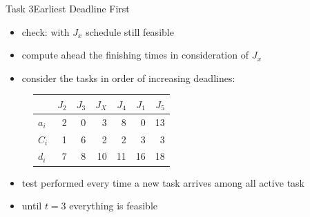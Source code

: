 \begin{frame}[allowframebreaks]{Task 3}{Earliest Deadline First\vspace{0.5cm}}
  \begin{itemize}
    \item \alert{check:} with $J_x$ schedule \alert{still feasible}
    \item compute \alert{ahead} the \alert{finishing times} in consideration of $J_x$
    \item consider the tasks \alert{in order of increasing deadlines:}
  \end{itemize}
  \begin{figure}
  \centering
  \begin{tabular}{|l|r|r|r|r|r|r|}
    \hline             & $J_2$ & $J_3$ & $J_X$ & $J_4$ & $J_1$ & $J_5$ \\
    \hline \hline$a_i$ & 2     & 0     & 3     & 8     & 0     & 13 \\
    \hline$C_i$        & 1     & 6     & 2     & 2     & 3     & 3 \\
    \hline$d_i$        & 7     & 8     & 10    & 11    & 16    & 18 \\
    \hline
  \end{tabular}
  \end{figure}
  \begin{itemize}
    \item test performed every time a new \alert{task arrives} among \alert{all active task}
  \item until $t=3$ \alert{everything is feasible}
    \begin{itemize}

\end{itemize}
\end{itemize}
\end{frame}
